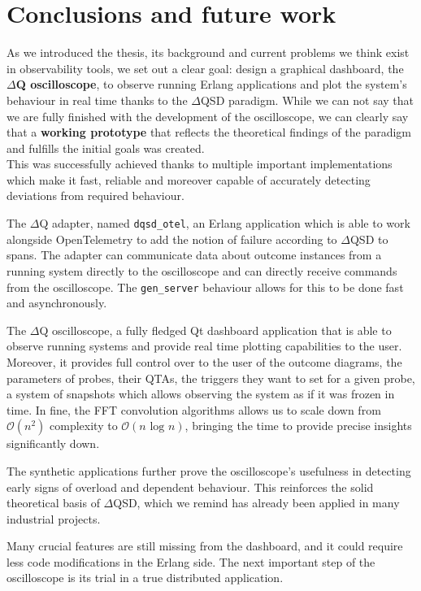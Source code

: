 \chapter{Conclusions and future work}

    As we introduced the thesis, its background and current problems we think exist in observability tools, we set out a clear goal: design a graphical dashboard, the \textbf{$\Delta$Q oscilloscope}, to observe running Erlang applications and plot the system's behaviour in real time thanks to the $\Delta$QSD paradigm.
    While we can not say that we are fully finished with the development of the oscilloscope, we can clearly say that a \textbf{working prototype} that reflects the theoretical findings of the paradigm and fulfills the initial goals was created. \\
    This was successfully achieved thanks to multiple important implementations which make it fast, reliable and moreover capable of accurately detecting deviations from required behaviour.
    
    The $\Delta$Q adapter, named \texttt{dqsd\_otel}, an Erlang application which is able to work alongside OpenTelemetry to add the notion of failure according to $\Delta$QSD to spans. The adapter can communicate data about outcome instances from a running system directly to the oscilloscope and can directly receive commands from the oscilloscope. The \texttt{gen\_server} behaviour allows for this to be done fast and asynchronously.


    The $\Delta$Q oscilloscope, a fully fledged Qt dashboard application that is able to observe running systems and provide real time plotting capabilities to the user. Moreover, it provides full control over to the user of the outcome diagrams, the parameters of probes, their QTAs, the triggers they want to set for a given probe, a system of snapshots which allows observing the system as if it was frozen in time. In fine, the FFT convolution algorithms allows us to scale down from $\mathcal{O}(n^2)$ complexity to $\mathcal{O}(n\text{ log }n)$, bringing the time to provide precise insights significantly down.

    The synthetic applications further prove the oscilloscope's usefulness in detecting early signs of overload and dependent behaviour. This reinforces the solid theoretical basis of $\Delta$QSD, which we remind has already been applied in many industrial projects.

    Many crucial features are still missing from the dashboard, and it could require less code modifications in the Erlang side. The next important step of the oscilloscope is its trial in a true distributed application.

